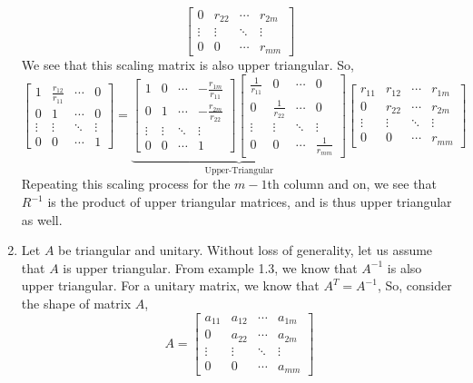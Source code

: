\documentclass[letterpaper,10pt]{article}
\begin{document}
\begin{enumerate}
\[\begin{bmatrix}
0 & r_{22} & \cdots & r_{2m}\\
\vdots & \vdots & \ddots & \vdots\\
0 & 0 & \cdots & r_{mm}
\end{bmatrix} \]
We see that this scaling matrix is also upper triangular. So,
\[\begin{bmatrix}
1 & \frac{r_{12}}{r_{11}} & \cdots & 0\\
0 & 1 & \cdots & 0\\
\vdots & \vdots & \ddots & \vdots\\
0 & 0 & \cdots & 1
\end{bmatrix}=\underbrace{\begin{bmatrix}
1 & 0 & \cdots & -\frac{r_{1m}}{r_{11}}\\
0 & 1 & \cdots & -\frac{r_{2m}}{r_{22}}\\
\vdots & \vdots & \ddots & \vdots\\
0 & 0 & \cdots & 1
\end{bmatrix} \begin{bmatrix}
\frac{1}{r_{11}} & 0 & \cdots & 0\\
0 & \frac{1}{r_{22}} & \cdots & 0\\
\vdots & \vdots & \ddots & \vdots\\
0 & 0 & \cdots & \frac{1}{r_{mm}}
\end{bmatrix}}_{\text{Upper-Triangular}}\begin{bmatrix}
r_{11} & r_{12} & \cdots & r_{1m}\\
0 & r_{22} & \cdots & r_{2m}\\
\vdots & \vdots & \ddots & \vdots\\
0 & 0 & \cdots & r_{mm}
\end{bmatrix} \]
Repeating this scaling process for the $m-1$th column and on, we see that $R^{-1}$ is the product of upper triangular matrices, and is thus upper triangular as well. 
\item Let $A$ be triangular and unitary. Without loss of generality, let us assume that $A$ is upper triangular. From example 1.3, we know that $A^{-1}$ is also upper triangular. For a unitary matrix, we know that $A^T=A^{-1}$, So, consider the shape of matrix $A$,
\[A=\begin{bmatrix}
a_{11} & a_{12} & \cdots & a_{1m}\\
0 & a_{22} & \cdots & a_{2m}\\
\vdots & \vdots & \ddots & \vdots\\
0 & 0 & \cdots & a_{mm}
\end{bmatrix}\]

\end{enumerate}
\end{document}
